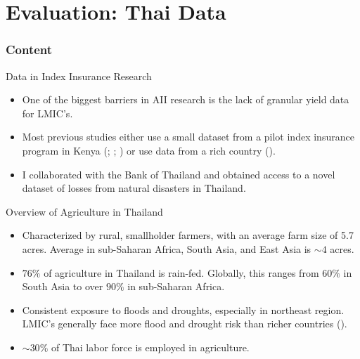 \documentclass{beamer}
\begin{document}
\section{Evaluation: Thai Data}
\begin{frame}
    \frametitle{Content}
    \tableofcontents[currentsection]
  \end{frame}

  \begin{frame}{Data in Index Insurance Research}
    \begin{itemize}
        \setlength \itemsep{2em}
        \item One of the biggest barriers in AII research is the lack of granular yield data for LMIC's.
        \item Most previous studies either use a small dataset from a pilot index insurance program in Kenya (\cite{chantarat2013designing}; \cite{flatnes2018improving}; \cite{estefania2024breaking}) or use data from a rich country (\cite{chen2023managing}). 
        \item I collaborated with the Bank of Thailand and obtained access to a novel dataset of losses from natural disasters in Thailand. 
    \end{itemize}
    
  \end{frame}

    \begin{frame}{Overview of Agriculture in Thailand}
        \begin{itemize}
            \setlength \itemsep{2em}
            \item Characterized by rural, smallholder farmers, with an average farm size of 5.7 acres. Average in sub-Saharan Africa, South Asia, and East Asia is $\sim 4$ acres. 
            \item $76\%$ of agriculture in Thailand is rain-fed. Globally, this ranges from $60\%$ in South Asia to over $90\%$ in sub-Saharan Africa. 
            \item Consistent exposure to floods and droughts, especially in northeast region. LMIC's generally face more flood and drought risk than richer countries (\cite{winsemius2018disaster}). 
            \item $\sim 30\%$ of Thai labor force is employed in agriculture. 
        \end{itemize}
    \end{frame}
    
\end{document}
